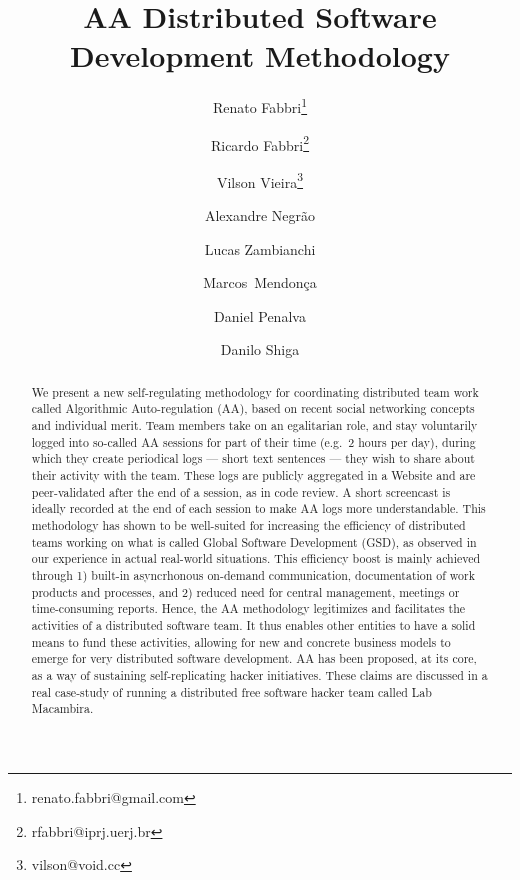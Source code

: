 \title{
AA Distributed Software Development Methodology
}


\author[1,3]{Renato Fabbri\thanks{renato.fabbri@gmail.com}}
\author[2,3]{Ricardo Fabbri\thanks{rfabbri@iprj.uerj.br}}
\author[1,3]{Vilson Vieira\thanks{vilson@void.cc}}
\author[3]{Alexandre Negr\~{a}o}
\author[3]{Lucas Zambianchi}
\author[3]{Marcos~Mendon\c{c}a}
\author[1,3]{Daniel Penalva}
\author[3]{Danilo Shiga}

\renewcommand\Authands{ and }


\maketitle

\begin{abstract}
We present a new self-regulating methodology for coordinating distributed team
work called Algorithmic Auto-regulation (AA), based on recent social networking
concepts and individual merit. Team members take on an egalitarian role, and
stay voluntarily logged into so-called AA sessions for part of their time (e.g.\
2 hours per day), during which they create periodical logs --- short text
sentences --- they wish to share about their activity with the team. These logs
are publicly aggregated in a Website and are peer-validated after the end of a
session, as in code review.  A short screencast is ideally recorded at the end
of each session to make AA logs more understandable.  This methodology has shown
to be well-suited for increasing the efficiency of distributed teams working on
what is called Global Software Development (GSD), as observed in our experience
in actual real-world situations.  This efficiency boost is mainly achieved through 1)
built-in asyncrhonous on-demand communication, documentation of work products
and processes, and 2) reduced need for central management, meetings or
time-consuming reports. Hence, the AA methodology legitimizes and facilitates
the activities of a distributed software team.  It thus enables other entities
to have a solid means to fund these activities, allowing for new and concrete
business models to emerge for very distributed software development. AA has been
proposed, at its core, as a way of sustaining self-replicating hacker
initiatives. These claims are discussed in a real case-study of running a
distributed free software hacker team called Lab Macambira.  
\end{abstract}
